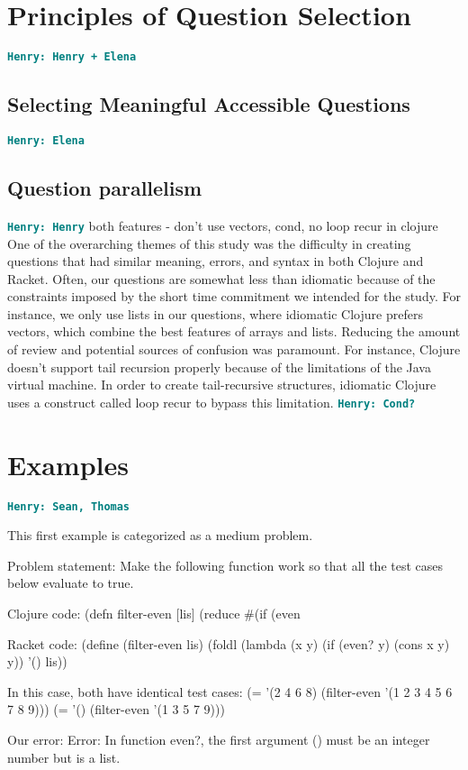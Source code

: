 \documentclass[12pt]{article}
\newcommand{\comment}[1]{{\bf \tt  {#1}}}
\newcommand{\hfcomment}[1]{\textcolor{Teal}{\comment{Henry: {#1}}}}
\begin{document}
\section{Principles of Question Selection}\label{sec:select}
	\hfcomment{Henry + Elena}
	\subsection{Selecting Meaningful Accessible Questions}\label{sec:meaning}
	\hfcomment{Elena}
	\subsection{Question parallelism}\label{sec:parallel}
	\hfcomment{Henry}
	both features - don't use vectors, cond, no loop recur in clojure
	One of the overarching themes of this study was the difficulty in creating questions that had similar meaning, errors, and syntax in both Clojure and Racket.
	 Often, our questions are somewhat less than idiomatic because of the constraints imposed by the short time commitment we intended for the study.
	  For instance, we only use lists in our questions, where idiomatic Clojure prefers vectors, which combine the best features of arrays and lists.
	   Reducing the amount of review and potential sources of confusion was paramount. 
	   For instance, Clojure doesn't support tail recursion properly because of the limitations of the Java virtual machine.
	    In order to create tail-recursive structures, idiomatic Clojure uses a construct called loop recur to bypass this limitation. \hfcomment{Cond?}
\section{Examples}\label{sec:examples}
	\hfcomment{Sean, Thomas}
	
	This first example is categorized as a medium problem. 	
	
	Problem statement:
		Make the following function work so that all the test cases below evaluate to true.
	
	Clojure code:
		(defn filter-even [lis] (reduce #(if (even %

	Racket code:
		(define (filter-even lis) (foldl (lambda (x y) (if (even? y) (cons x y) y)) '() lis))

	In this case, both have identical test cases: 
		(= '(2 4 6 8) (filter-even '(1 2 3 4 5 6 7 8 9)))
		(= '() (filter-even '(1 3 5 7 9)))

	Our error:
		Error: In function even?, the first argument () must be an integer number but is a list.
\end{document}
